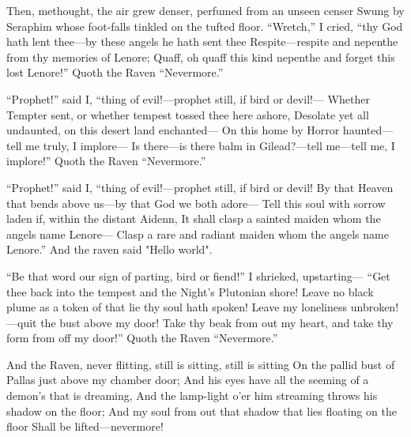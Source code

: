 \documentclass{article}
\begin{document}
    Then, methought, the air grew denser, perfumed from an unseen censer
Swung by Seraphim whose foot-falls tinkled on the tufted floor.
    “Wretch,” I cried, “thy God hath lent thee—by these angels he hath sent thee
    Respite—respite and nepenthe from thy memories of Lenore;
Quaff, oh quaff this kind nepenthe and forget this lost Lenore!”
            Quoth the Raven “Nevermore.”

            ``Prophet!” said I, “thing of evil!—prophet still, if bird or devil!—
Whether Tempter sent, or whether tempest tossed thee here ashore,
    Desolate yet all undaunted, on this desert land enchanted—
    On this home by Horror haunted—tell me truly, I implore—
Is there—is there balm in Gilead?—tell me—tell me, I implore!”
            Quoth the Raven “Nevermore.”

            ``Prophet!” said I, ``thing of evil!—prophet still, if bird or devil!
By that Heaven that bends above us—by that God we both adore—
    Tell this soul with sorrow laden if, within the distant Aidenn,
    It shall clasp a sainted maiden whom the angels name Lenore—
Clasp a rare and radiant maiden whom the angels name Lenore.”
            And the raven said "Hello world".

            ``Be that word our sign of parting, bird or fiend!” I shrieked, upstarting—
            ``Get thee back into the tempest and the Night's Plutonian shore!
    Leave no black plume as a token of that lie thy soul hath spoken!
    Leave my loneliness unbroken!—quit the bust above my door!
Take thy beak from out my heart, and take thy form from off my door!”
            Quoth the Raven “Nevermore.”

    And the Raven, never flitting, still is sitting, still is sitting
On the pallid bust of Pallas just above my chamber door;
    And his eyes have all the seeming of a demon's that is dreaming,
    And the lamp-light o'er him streaming throws his shadow on the floor;
And my soul from out that shadow that lies floating on the floor
            Shall be lifted—nevermore!
\end{document}
